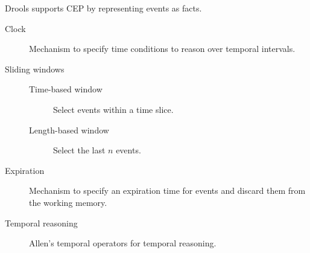 Drools supports CEP by representing events as facts.

\begin{description}
    \item[Clock]
        Mechanism to specify time conditions to reason over temporal intervals.

    \item[Sliding windows] \phantom{}
        \begin{description} 
            \item[Time-based window] Select events within a time slice. 
            \item[Length-based window] Select the last $n$ events.
        \end{description}

    \item[Expiration]
        Mechanism to specify an expiration time for events and discard them from the working memory.

    \item[Temporal reasoning]
        Allen's temporal operators for temporal reasoning.
\end{description}